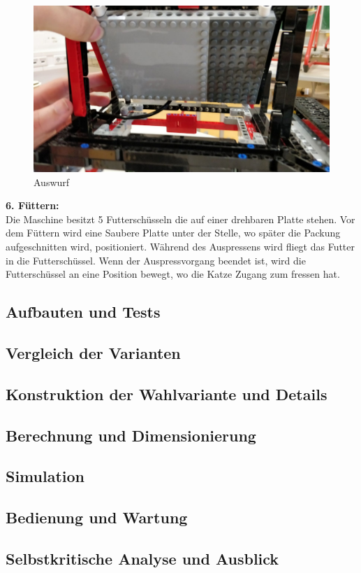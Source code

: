 \documentclass[a4paper,12pt]{scrartcl}
\begin{document}
\begin{figure}[H]
\begin{center}
\includegraphics[width=13cm]{Bilder/Ablauf_1_png/Auswurf_5}
\caption{Auswurf}
\end{center}
\end{figure}

\textbf{6. Füttern:} \\

Die Maschine besitzt 5 Futterschüsseln die auf einer drehbaren Platte stehen. Vor dem Füttern wird eine Saubere Platte unter der Stelle, wo später die Packung aufgeschnitten wird, positioniert. Während des Auspressens wird fliegt das Futter in die Futterschüssel. Wenn der Auspressvorgang beendet ist, wird die Futterschüssel an eine Position bewegt, wo die Katze Zugang zum fressen hat.

\subsection{Aufbauten und Tests}
\subsection{Vergleich der Varianten}
\subsection{Konstruktion der Wahlvariante und Details}
\subsection{Berechnung und Dimensionierung}
\subsection{Simulation}
\subsection{Bedienung und Wartung}
\subsection{Selbstkritische Analyse und Ausblick}
\end{document}
